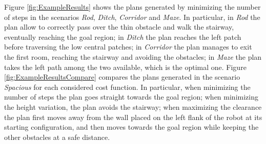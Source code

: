 Figure \ref{fig:ExampleResults} shows the plans generated by minimizing the number of steps in the scenarios \textit{Rod}, \textit{Ditch}, \textit{Corridor} and \textit{Maze}.
In particular, in \textit{Rod} the plan allow to correctly pass over the thin obstacle and walk the stairway, eventually reaching the goal region; in \textit{Ditch} the plan reaches the left patch before traversing the low central patches; in \textit{Corridor} the plan manages to exit the first room, reaching the stairway and avoiding the obstacles; in \textit{Maze} the plan takes the left path among the two available, which is the optimal one. 
Figure \ref{fig:ExampleResultsCompare} compares the plans generated in the scenario \textit{Spacious} for each considered cost function. 
In particular, when minimizing the number of steps the plan goes straight towards the goal region; when minimizing the height variation, the plan avoids the stairway; when maximizing the clearance the plan first moves away from the wall placed on the left flank of the robot at its starting configuration, and then moves towards the goal region while keeping the other obstacles at a safe distance.


